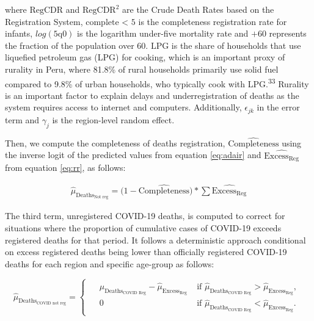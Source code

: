 \documentclass[
]{article}
\begin{document}
where \(\text{RegCDR}\) and \(\text{RegCDR}^2\) are the Crude Death Rates based on the Registration System, \(\text{complete < 5}\) is the completeness registration rate for infants, \(log(\text{5q0})\) is the logarithm under-five mortality rate and \(\text{+60}\) represents the fraction of the population over 60. \(\text{LPG}\) is the share of households that use liquefied petroleum gas (LPG) for cooking, which is an important proxy of rurality in Peru, where 81.8\% of rural households primarily use solid fuel compared to 9.8\% of urban households, who typically cook with LPG.\textsuperscript{33} Rurality is an important factor to explain delays and underregistration of deaths as the system requires access to internet and computers. Additionally, \(\epsilon_{jk}\) in the error term and \(\gamma_{j}\) is the region-level random effect.

Then, we compute the completeness of deaths registration, \(\widehat{\text{Completeness}}\) using the inverse logit of the predicted values from equation \eqref{eq:adair} and \(\widehat{{\text{Excess}}_\text{Reg}}\) from equation \eqref{eq:rr}, as follows:

\begin{equation}
\label{eq:unreg}
   \begin{aligned}
  \widehat{\mu}_{\text{Deaths}_\text{Not reg}}= \big(1-\widehat{\text{Completeness}}\big)*
  \sum{\widehat{{\text{Excess}}_\text{Reg}}}
   \end{aligned}      
\end{equation}

The third term, unregistered COVID-19 deaths, is computed to correct for situations where the proportion of cumulative cases of COVID-19 exceeds registered deaths for that period. It follows a deterministic approach conditional on excess registered deaths being lower than officially registered COVID-19 deaths for each region and specific age-group as follows:

\begin{equation}
\label{eq:covidnotreg}
   \widehat{\mu}_{\text{Deaths}_\text{COVID not reg}}=  
   \begin{cases}
    \begin{aligned}
 &  \widehat{\mu}_{\text{Deaths}_\text{COVID Reg}}-\widehat{\mu}_{\text{Excess}_\text{Reg}} \; & \text{if }\widehat{\mu}_{\text{Deaths}_\text{COVID Reg}} > \widehat{\mu}_{\text{Excess}_\text{Reg}},\\[1ex]
& 0 \;& \text{if }\widehat{\mu}_{\text{Deaths}_\text{COVID Reg}} < \widehat{\mu}_{\text{Excess}_\text{Reg}}.
  \end{aligned}
    \end{cases} 
\end{equation}
\end{document}
